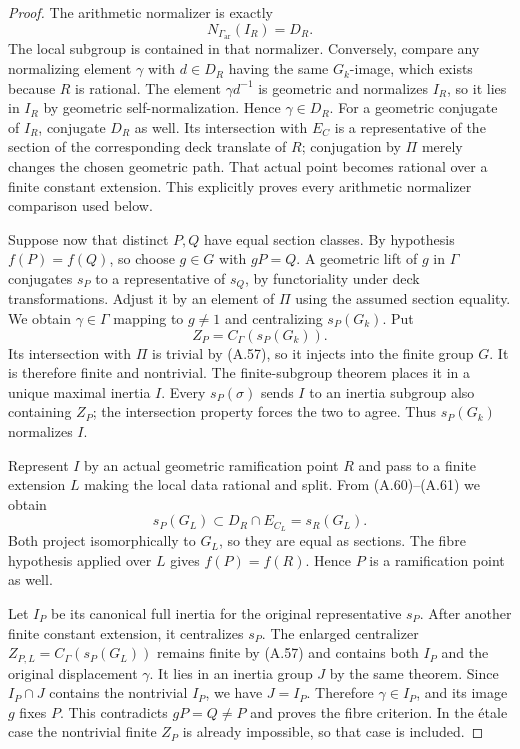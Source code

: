 \begin{proof}
The arithmetic normalizer is exactly
\[
 N_{\Gamma_{\mathrm{ar}}}(I_R)=D_R.                    \tag{A.61}
\]
The local subgroup is contained in that normalizer.
Conversely, compare any normalizing element $\gamma$
with $d\in D_R$ having the same $G_k$-image, which
exists because $R$ is rational. The element
$\gamma d^{-1}$ is geometric and normalizes $I_R$,
so it lies in $I_R$ by geometric self-normalization.
Hence $\gamma\in D_R$. For a geometric conjugate
of $I_R$, conjugate $D_R$ as well. Its intersection
with $E_C$ is a representative of the section of
the corresponding deck translate of $R$; conjugation
by $\Pi$ merely changes the chosen geometric path.
That actual point becomes rational over a finite
constant extension. This explicitly proves every
arithmetic normalizer comparison used below.

Suppose now that distinct $P,Q$ have equal section
classes. By hypothesis $f(P)=f(Q)$, so choose
$g\in G$ with $gP=Q$. A geometric lift of $g$ in
$\Gamma$ conjugates $s_P$ to a representative of
$s_Q$, by functoriality under deck transformations.
Adjust it by an element of $\Pi$ using the assumed
section equality. We obtain $\gamma\in\Gamma$
mapping to $g\ne1$ and centralizing $s_P(G_k)$.
Put
\[
 Z_P=C_\Gamma(s_P(G_k)).
\]
Its intersection with $\Pi$ is trivial by
\textup{(A.57)}, so it injects into the finite group
$G$. It is therefore finite and nontrivial.
The finite-subgroup theorem places it in a unique
maximal inertia $I$. Every $s_P(\sigma)$ sends $I$
to an inertia subgroup also containing $Z_P$;
the intersection property forces the two to agree.
Thus $s_P(G_k)$ normalizes $I$.

Represent $I$ by an actual geometric ramification
point $R$ and pass to a finite extension $L$ making
the local data rational and split. From
\textup{(A.60)--(A.61)} we obtain
\[
 s_P(G_L)\subset D_R\cap E_{C_L}=s_R(G_L).
\]
Both project isomorphically to $G_L$, so they are
equal as sections. The fibre hypothesis applied
over $L$ gives $f(P)=f(R)$. Hence $P$ is a
ramification point as well.

Let $I_P$ be its canonical full inertia for the
original representative $s_P$. After another
finite constant extension, it centralizes $s_P$.
The enlarged centralizer
$Z_{P,L}=C_\Gamma(s_P(G_L))$ remains finite by
\textup{(A.57)} and contains both $I_P$ and the
original displacement $\gamma$. It lies in an
inertia group $J$ by the same theorem. Since
$I_P\cap J$ contains the nontrivial $I_P$,
we have $J=I_P$. Therefore $\gamma\in I_P$,
and its image $g$ fixes $P$. This contradicts
$gP=Q\ne P$ and proves the fibre criterion.
In the \'etale case the nontrivial finite $Z_P$
is already impossible, so that case is included.


\end{proof}

